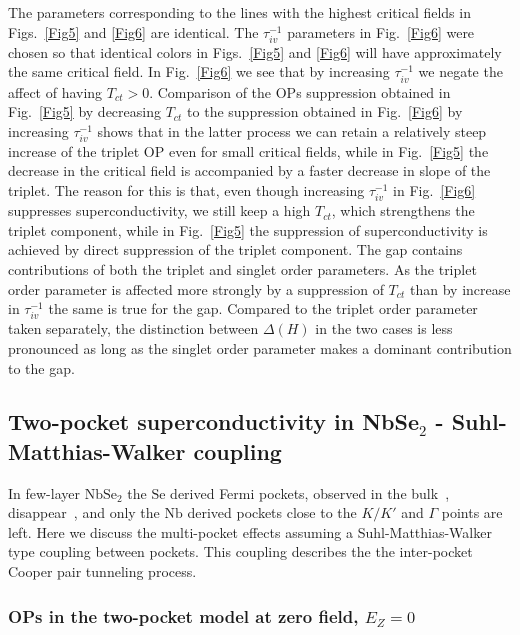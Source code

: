 \documentclass[showpacs,superscriptaddress,onecolumn,prb]{revtex4}
\begin{document}
The parameters corresponding to the lines with the highest critical fields in Figs.~\ref{Fig5} and \ref{Fig6} are identical. The $\tau_{iv}^{-1}$ parameters in Fig.~\ref{Fig6} were chosen so that identical colors in Figs.~\ref{Fig5} and \ref{Fig6} will have approximately the same critical field.   
In Fig.~\ref{Fig6}
we see that by increasing $\tau_{iv}^{-1}$ we negate the affect of
having $T_{ct}>0$. Comparison of the OPs suppression obtained in  Fig.~\ref{Fig5} by decreasing $T_{ct}$ to the suppression obtained in Fig.~\ref{Fig6} by increasing $\tau_{iv}^{-1}$ shows that in the latter process we can retain a relatively steep increase of the triplet OP even for small critical fields, while in Fig.~\ref{Fig5} the decrease in the critical field is accompanied by a faster decrease in slope of the triplet. The reason for this is that, even though increasing $\tau_{iv}^{-1}$ in Fig.~\ref{Fig6} suppresses superconductivity, we still keep a high $T_{ct}$, which strengthens the triplet component, while in  Fig.~\ref{Fig5} the suppression of superconductivity is achieved by direct suppression of the triplet component. The gap contains contributions of both the triplet and singlet order parameters. As the triplet order parameter is affected more strongly by a suppression of $T_{ct}$ than by increase in $\tau_{iv}^{-1}$ the same is true for the gap.
Compared to the triplet order parameter taken separately, the distinction between $\Delta(H)$ in the two cases is less pronounced as long as the singlet order parameter makes a dominant contribution to the gap.



\subsection{Two-pocket superconductivity in NbSe$_2$ - Suhl-Matthias-Walker coupling}\label{sec:two-pockets-MSW}



In few-layer $\mathrm{NbSe_2}$ the $\mathrm{Se}$ derived Fermi pockets, observed in the bulk~\cite{noat2015quasiparticle}, disappear~\cite{Wickramaratne2020}, and only the $\mathrm{Nb}$ derived pockets close to the $K/K'$ and $\Gamma$ points are left. Here we discuss the multi-pocket effects assuming a Suhl-Matthias-Walker\cite{Suhl1959} type coupling between pockets.
This coupling describes the the inter-pocket  Cooper pair tunneling process.


\subsubsection{OPs in the two-pocket model at zero field, \texorpdfstring{$E_Z =0$}{TEXT}}
\label{sec:OPs_ZeroB}
\end{document}
